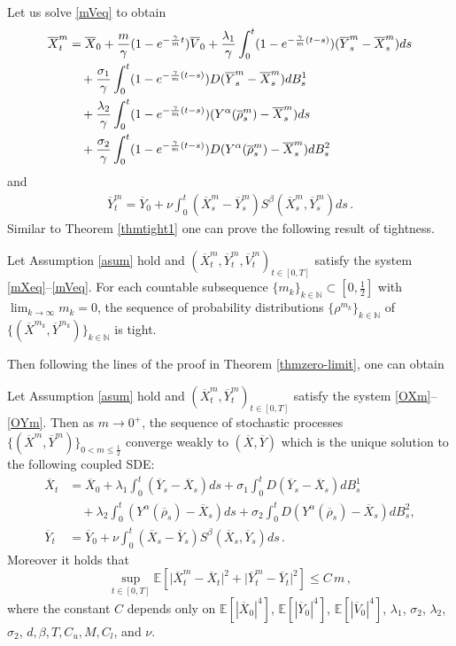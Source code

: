 \documentclass{ims9x6}
\newcommand{\nn}{\nonumber}
\renewcommand{\bar}{\overline}
\newcommand{\EE}{\mathbb{E}}
\newcommand{\OV}{\overline{V}}
\newcommand{\OX}{\overline{X}}
\newcommand{\OY}{\overline{Y}}
\begin{document}
Let us solve \eqref{mVeq} to obtain
\begin{align}\label{OXm}
\OX_t^m&=\OX_0+\frac{m}{\gamma}(1-e^{-\frac{\gamma}{m}t})\OV_0
+\frac{\lambda_1}{\gamma}\int_0^t(1-e^{-\frac{\gamma}{m}(t-s)}) (\OY_s^m-\OX_s^m)ds \nn\\ &\quad +\frac{\sigma_1}{\gamma}\int_0^t(1-e^{-\frac{\gamma}{m}(t-s)}) D(\OY_s^m-\OX_s^m)dB_s^1\notag\\
&\quad +\frac{\lambda_2}{\gamma}\int_0^t(1-e^{-\frac{\gamma}{m}(t-s)}) (Y^{\alpha}(\bar\rho_s^m)-\OX_s^m)ds\\ &\quad+\frac{\sigma_2}{\gamma}\int_0^t(1-e^{-\frac{\gamma}{m}(t-s)}) D(Y^{\alpha}(\bar\rho_s^m)-\OX_s^m)dB_s^2\nn
\end{align}
and
\begin{align}\label{OYm}
\OY_{t}^{m}=\OY_0+\nu\int_0^t\left(\OX_{s}^{m}-\OY_{s}^{m}\right) S^{\beta}\left(\OX_{s}^{m}, \OY_{s}^{m}\right) d s\,.
\end{align}
Similar to Theorem \ref{thmtight1} one can prove the following result of tightness.
\begin{theorem}\label{thmtight2}
	Let Assumption \ref{asum} hold and $(\OX_t^m,\OY_t^m,\OV_t^m)_{t\in[0,T]}$ satisfy the system \eqref{mXeq}--\eqref{mVeq}.  For each countable subsequence $\{m_k\}_{k\in\mathbb N} \subset [0,\frac{1}{2}]$ with $\lim_{k\rightarrow \infty}m_k=0$, the sequence of probability distributions   $\{\rho^{m_k}\}_{k\in\mathbb N}$ of $\{(\OX^{m_k},\OY^{m_k})\}_{k\in\mathbb N}$  is tight.
\end{theorem}
Then following the lines of the proof in Theorem \ref{thmzero-limit}, one can obtain
\begin{theo-frmd}
	Let Assumption \ref{asum} hold and $(\OX_t^m,\OY_t^m)_{t\in[0,T]}$ satisfy the system \eqref{OXm}--\eqref{OYm}. Then as $m\rightarrow 0^+$, the sequence of  stochastic processes $\{(\OX^m,\OY^m)\}_{0< m\leq \frac{1}{2}}$  converge weakly to $(\OX,\OY)$  which is the unique solution to the following coupled SDE:
	\begin{align*}
	\OX_t&=\OX_0
	+\lambda_1\int_0^t (\OY_s-\OX_s)ds +\sigma_1\int_0^tD(\OY_s-\OX_s)dB_s^1\nn\\
	&\quad+\lambda_2\int_0^t (Y^{\alpha}(\bar\rho_s)-\OX_s)ds +\sigma_2\int_0^t D(Y^{\alpha}(\bar\rho_s)-\OX_s)dB_s^2,
	\\
	\OY_{t}&=\OY_0+\nu\int_0^t\left(\OX_{s}-\OY_{s}\right) S^{\beta}\left(\OX_{s}, \OY_{s}\right) d s\,.
	\end{align*}
	Moreover it holds that
	\begin{equation}\label{est-convegence-m-xy}
	\sup_{t\in[0,T]}\EE\left[\big|\OX^m_t-\OX_t\big|^2
	+\big|\OY^m_t-\OY_t\big|^2
	\right]\leq C \, m\,,
	\end{equation}
	where the constant $C$ depends only on $\EE[|\OX_0|^4]$, $\EE[|\OY_0|^4]$, $\EE[|\OV_0|^4]$, $\lambda_1$, $\sigma_2$, $\lambda_2$, $\sigma_2$, $d,\beta,T,C_u,M,C_l$, and $\nu$.
\end{theo-frmd}
\end{document}
